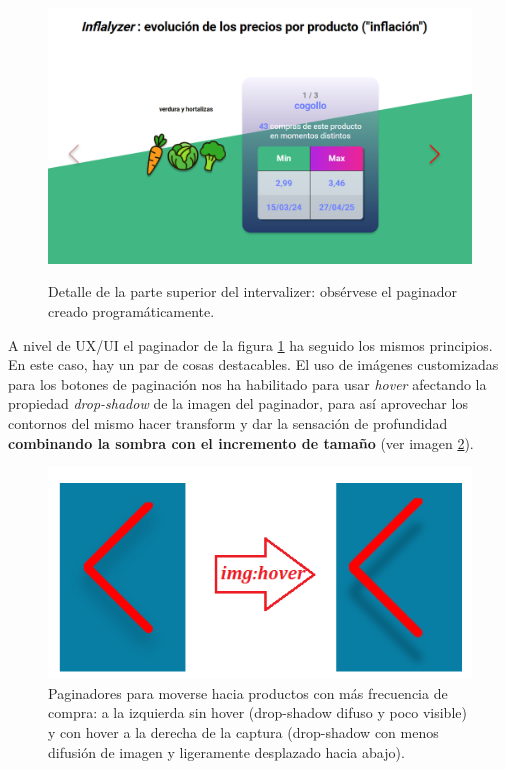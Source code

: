 \documentclass[a4paper,12pt]{report}
\begin{document}
	\FloatBarrier
	\begin{figure}[H]
		\centering
		\caption{Detalle de la parte superior del intervalizer: obsérvese el paginador creado programáticamente.}
		\includegraphics[width=1\linewidth]{img/imatgeSwiperCustom.png}
		\label{fig:imatgeSwiperCustom}
	\end{figure}
	\FloatBarrier
	
	A nivel de UX/UI el paginador de la figura \ref{fig:imatgeSwiperCustom} ha seguido los mismos principios. En este caso, hay un par de cosas destacables. El uso de imágenes customizadas para los botones de paginación nos ha habilitado para usar \textit{hover} afectando la propiedad \textit{drop-shadow} de la imagen del paginador, para así aprovechar los contornos del mismo hacer transform y dar la sensación de profundidad \textbf{combinando la sombra con el incremento de tamaño} (ver imagen \ref{fig:paginadorscustom}).
	

	\FloatBarrier
	\begin{figure}[H]
		\centering
		\caption{Paginadores para moverse hacia productos con más frecuencia de compra: a la izquierda sin hover (drop-shadow difuso y poco visible) y con hover a la derecha de la captura (drop-shadow con menos difusión de imagen y ligeramente desplazado hacia abajo).}
		\includegraphics[width=1\linewidth]{img/paginadorsCustom}

		\label{fig:paginadorscustom}
	\end{figure}
	\FloatBarrier
	
\end{document}
